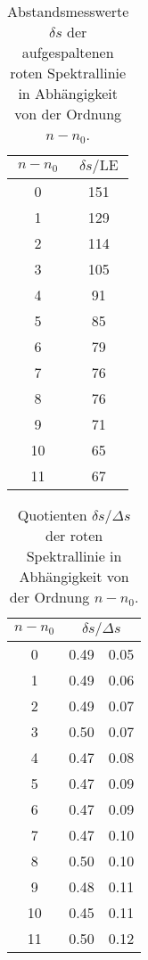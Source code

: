 \begin{table}[H]
  \centering
  \caption{Abstandsmesswerte $\delta s$ der aufgespaltenen roten Spektrallinie in Abhängigkeit von der Ordnung $n-n_0$.}
  \begin{tabular}{S[table-format=2.0] S[table-format=3.0]}
    \toprule
    {$n-n_0$} & {$\delta s/\text{LE}$}\\
      & 151 \\
    1  & 129 \\
    2  & 114 \\
    3  & 105 \\
    4  & 91  \\
    5  & 85  \\
    6  & 79  \\
    7  & 76  \\
    8  & 76  \\
    9  & 71  \\
    10 & 65  \\
    11 & 67  \\
    \bottomrule
  \end{tabular}
  \label{tab:redB}
\end{table}

\begin{table}[H]
  \centering
  \caption{Quotienten $\delta s/\Delta s$ der roten Spektrallinie in Abhängigkeit von der Ordnung $n-n_0$.}
  \begin{tabular}{S[table-format=2.0] S[table-format=1.2] @{${}\pm{}$} S[table-format=1.2]}
    \toprule
    {$n-n_0$} & \\
      & 0.49 & 0.05 \\
    1  & 0.49 & 0.06 \\
    2  & 0.49 & 0.07 \\
    3  & 0.50 & 0.07 \\
    4  & 0.47 & 0.08 \\
    5  & 0.47 & 0.09 \\
    6  & 0.47 & 0.09 \\
    7  & 0.47 & 0.10 \\
    8  & 0.50 & 0.10 \\
    9  & 0.48 & 0.11 \\
    10 & 0.45 & 0.11 \\
    11 & 0.50 & 0.12 \\
    \bottomrule
  \end{tabular}
  \label{tab:redquot}
\end{table}

